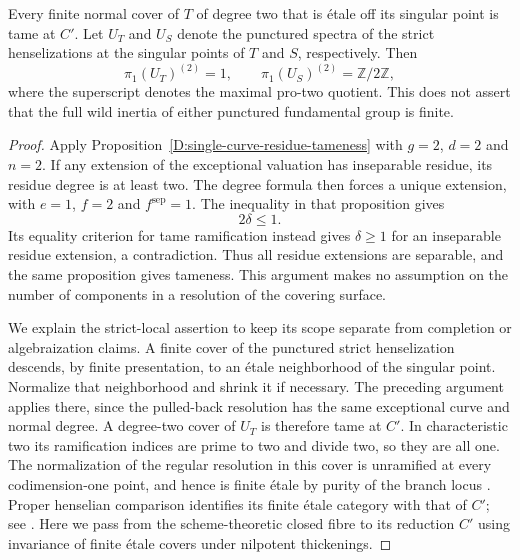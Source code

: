 \begin{corollary}
\label{D:wild-genus2-pro2}
Every finite normal cover of $T$ of degree two that is
\'etale off its singular point is tame at $C'$.
Let $U_T$ and $U_S$ denote the punctured spectra of the
strict henselizations at the singular points of $T$ and
$S$, respectively.  Then
\[
                 \pi_1(U_T)^{(2)}=1,\qquad
                 \pi_1(U_S)^{(2)}=\mathbb Z/2\mathbb Z,
\]
where the superscript denotes the maximal pro-two quotient.
This does not assert that the full wild inertia of either
punctured fundamental group is finite.
\end{corollary}
\begin{proof}
Apply Proposition~\ref{D:single-curve-residue-tameness} with
$g=2$, $d=2$ and $n=2$.  If any extension of the exceptional
valuation has inseparable residue, its residue degree is
at least two.  The degree formula then forces a unique
extension, with $e=1$, $f=2$ and $f^{\mathrm{sep}}=1$.
The inequality in that proposition gives
\[
                              2\delta\leq1.
\]
Its equality criterion for tame ramification instead gives
$\delta\geq1$ for an inseparable residue extension, a
contradiction.  Thus all residue extensions are separable,
and the same proposition gives tameness.  This argument
makes no assumption on the number of components in a
resolution of the covering surface.

We explain the strict-local assertion to keep its scope
separate from completion or algebraization claims.  A
finite cover of the punctured strict henselization descends,
by finite presentation, to an \'etale neighborhood
of the singular point.  Normalize that neighborhood and
shrink it if necessary.  The preceding argument applies
there, since the pulled-back resolution has the same
exceptional curve and normal degree.  A degree-two cover
of $U_T$ is therefore tame at $C'$.  In characteristic two
its ramification indices are prime to two and divide two,
so they are all one.  The normalization of the regular
resolution in this cover is unramified at every
codimension-one point, and hence is finite \'etale
by purity of the branch locus
\cite[Lemma 58.21.4, tag 0BMB]{StacksBWildSource}.
Proper henselian
comparison identifies its finite \'etale category
with that of $C'$; see
\cite[Lemma 58.9.1, tag 0A48]{StacksBCuspLocal}.
Here we pass from the scheme-theoretic closed fibre to
its reduction $C'$ using invariance of finite \'etale
covers under nilpotent thickenings.


\end{proof}
